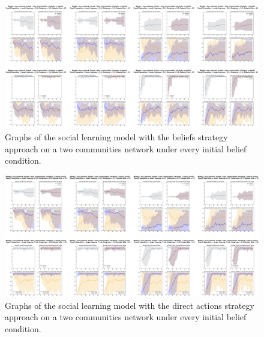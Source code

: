 \documentclass[]{llncs}
\begin{document}
\begin{figure}
\centering
\includegraphics[width=15cm]{images/social_twocommunities1}
\caption{\label{social_twocommunities1} Graphs of the social learning model with the beliefs strategy approach on a two communities network under every initial belief condition.}
\end{figure}
\begin{figure}
\centering
\includegraphics[width=15cm]{images/social_twocommunities2}
\caption{\label{social_twocommunities2} Graphs of the social learning model with the direct actions strategy approach on a two communities network under every initial belief condition.}
\end{figure}
\end{document}
